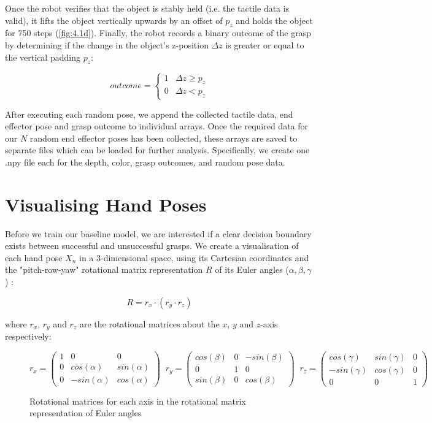\documentclass[12pt, a4paper]{report}
\theoremstyle{definition}
\begin{document}
Once the robot verifies that the object is stably held (i.e. the tactile data is valid), it lifts the object vertically upwards by an offset of $p_z$ and holds the object for 750 steps (\ref{fig:4.1d}). Finally, the robot records a binary outcome of the grasp by determining if the change in the object's z-position $\Delta z$ is greater or equal to the vertical padding $p_z$:

\begin{equation}
    outcome=\begin{cases}1 & \Delta z\geq p_z \\ 0 & \Delta z<p_z\end{cases}
\end{equation}

After executing each random pose, we append the collected tactile data, end effector pose and grasp outcome to individual arrays. Once the required data for our $N$ random end effector poses has been collected, these arrays are saved to separate files which can be loaded for further analysis. Specifically, we create one .npy file each for the depth, color, grasp outcomes, and random pose data.


\newpage
\section{Visualising Hand Poses}
\label{sec:4.3}
Before we train our baseline model, we are interested if a clear decision boundary exists between successful and unsuccessful grasps. We create a visualisation of each hand pose $X_n$ in a 3-dimensional space, using its Cartesian coordinates and the "pitch-row-yaw" rotational matrix representation $R$ of its Euler angles ($\alpha,\beta,\gamma$) \cite{euleranglewolfram}:

\begin{equation}
    R=r_x\cdot(r_y\cdot r_z)
\end{equation}

\noindent where $r_x$, $r_y$ and $r_z$ are the rotational matrices about the $x$, $y$ and $z$-axis respectively:

\begin{figure}[H]
    \centering
    \begin{equation*}
        r_x = \begin{pmatrix}1&0&0 \\ 0&cos(\alpha)&sin(\alpha) \\ 0&-sin(\alpha)&cos(\alpha)\end{pmatrix}\;\;
        r_y = \begin{pmatrix}cos(\beta)&0&-sin(\beta) \\ 0&1&0 \\ sin(\beta)&0&cos(\beta)\end{pmatrix}\;\;
        r_z = \begin{pmatrix}cos(\gamma)&sin(\gamma)&0 \\ -sin(\gamma)&cos(\gamma)&0 \\ 0&0&1 \end{pmatrix}
    \end{equation*}
    \caption{Rotational matrices for each axis in the rotational matrix representation of Euler angles}
    \label{fig:4.3}
\end{figure}
\end{document}
